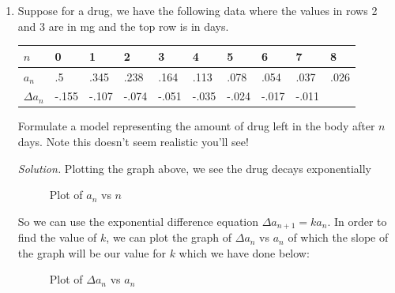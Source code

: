 \documentclass[12pt,letterpaper]{article}
\begin{document}
\begin{enumerate}
\item Suppose for a drug,  we have the following data where the values in rows 2 and 3 are in mg and the top row is in days.

\begin{tabular}{|l|l|l|l|l|l|l|l|l|l|}
\hline
$n$          & 0     & 1     & 2     & 3     & 4     & 5     & 6     & 7     & 8    \\ \hline
$a_n$        & .5    & .345  & .238  & .164  & .113  & .078  & .054  & .037  & .026 \\ \hline
$\Delta a_n$ & -.155 & -.107 & -.074 & -.051 & -.035 & -.024 & -.017 & -.011 &      \\ \hline
\end{tabular}

\noindent Formulate a model representing the amount of drug left in the body after $n$ days. Note this doesn't seem realistic you'll see!

\emph{Solution.}
Plotting the graph above, we see the drug decays exponentially
\begin{figure}[!htb]
  \caption{\label{fig:8} Plot of $a_{n}$ vs $n$}
\end{figure}

So we can use the exponential difference equation $\Delta a_{n+1} = ka_{n}$. 
In order to find the value of $k$, we can plot the graph of $\Delta a_{n}$ vs $a_{n}$ 
of which the slope of the graph will be our value for $k$ which we have done below:
\begin{figure}[!htb]
  \caption{\label{fig:9} Plot of $\Delta a_{n}$ vs $a_{n}$}
\end{figure}


\end{enumerate}
\end{document}

